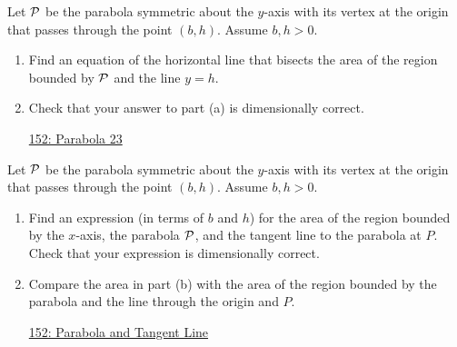 \documentclass{ximera}
\begin{document}
\begin{question} \label{Q88w88ewe}
Let ${\cal P}$ be the parabola symmetric about the $y$-axis with its vertex at the origin that passes through the point $(b,h)$. Assume $b,h>0$.

\begin{enumerate}

\item Find an equation of the horizontal line that bisects the area of the region bounded by ${\cal P}$ and the line $y=h$.

\item Check that your answer to part (a) is dimensionally correct.

\begin{onlineOnly}
    \begin{center}
\end{center}
\end{onlineOnly}

\href{https://www.desmos.com/calculator/mbxrsmdho8}{152: Parabola 23}

\end{enumerate}
\end{question}


\begin{question} \label{Q88w4448ewe}
Let ${\cal P}$ be the parabola symmetric about the $y$-axis with its vertex at the origin that passes through the point $(b,h)$. Assume $b,h>0$.

\begin{enumerate}

\item Find an expression (in terms of $b$ and $h$) for the area of the region bounded by the $x$-axis, the parabola ${\cal P}$, and the tangent line to the parabola at $P$. Check that your expression is dimensionally correct.

\item Compare the area in part (b) with the area of the region bounded by the parabola and the line through the origin and $P$.

\begin{onlineOnly}
    \begin{center}
\end{center}
\end{onlineOnly}

\href{https://www.desmos.com/calculator/3ulhw9wx4w}{152: Parabola and Tangent Line}

\end{enumerate}
\end{question}
\end{document}
